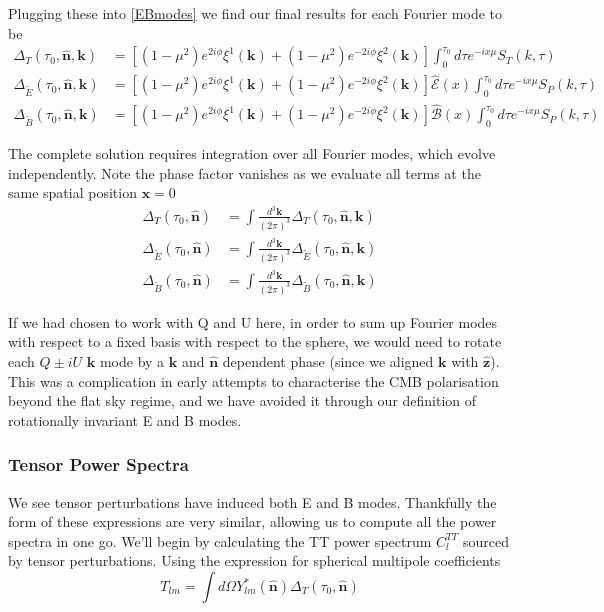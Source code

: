 \documentclass[a4paper,10pt]{article}
\renewcommand{\v}[1]{\mathbf{#1}}
\newcommand{\fint}[1]{\int \frac{d^3 \v{#1}}{(2\pi)^3}}
\newcommand{\unit}[1]{\hat{\v{#1}}}
\begin{document}
Plugging these into \ref{EBmodes} we find our final results for each Fourier mode to be
\begin{equation}\begin{split}
\Delta_T(\tau_0,\unit{n},\v{k}) &= [(1-\mu^2) e^{2i\phi} \xi^1(\v{k})+(1-\mu^2) e^{-2i\phi} \xi^2(\v{k})]\int_0^{\tau_0}d\tau e^{-ix\mu}S_T(k,\tau)\\
\Delta_{\tilde{E}}(\tau_0,\unit{n},\v{k}) &= [(1-\mu^2) e^{2i\phi} \xi^1(\v{k})+(1-\mu^2) e^{-2i\phi} \xi^2(\v{k})]\hat{\mathcal{E}}(x)\int_0^{\tau_0}d\tau e^{-ix\mu}S_P(k,\tau)\\
\Delta_{\tilde{B}}(\tau_0,\unit{n},\v{k}) &= [(1-\mu^2) e^{2i\phi} \xi^1(\v{k})+(1-\mu^2) e^{-2i\phi} \xi^2(\v{k})]\hat{\mathcal{B}}(x)\int_0^{\tau_0}d\tau e^{-ix\mu}S_P(k,\tau)
\label{LoSFourier}
\end{split}\end{equation}

The complete solution requires integration over all Fourier modes, which evolve independently. Note the phase factor vanishes as we evaluate all terms at the same spatial position $\v{x}=0$ 
\begin{equation}\begin{split}
\Delta_T(\tau_0,\unit{n}) &= \fint{k} \Delta_T(\tau_0,\unit{n},\v{k})\\
\Delta_{\tilde{E}}(\tau_0,\unit{n}) &= \fint{k} \Delta_{\tilde{E}}(\tau_0,\unit{n},\v{k})\\
\Delta_{\tilde{B}}(\tau_0,\unit{n}) &= \fint{k} \Delta_{\tilde{B}}(\tau_0,\unit{n},\v{k})
\end{split}\end{equation}

If we had chosen to work with Q and U here, in order to sum up Fourier modes with respect to a fixed basis with respect to the sphere, we would need to rotate each $Q\pm iU$ $\v{k}$ mode by a $\v{k}$ and $\unit{n}$ dependent phase (since we aligned $\v{k}$ with $\unit{z}$). This was a complication in early attempts to characterise the CMB polarisation beyond the flat sky regime, and we have avoided it through our definition of rotationally invariant E and B modes.\\



\subsubsection{Tensor Power Spectra}

We see tensor perturbations have induced both E and B modes. Thankfully the form of these expressions are very similar, allowing us to compute all the power spectra in one go. We'll begin by calculating the TT power spectrum $C_l^{TT}$ sourced by tensor perturbations. Using the expression for spherical multipole coefficients 
\begin{equation}
T_{lm} = \int d\Omega Y_{lm}^*(\unit{n})\Delta_T(\tau_0,\unit{n})
\end{equation}
\end{document}
